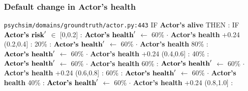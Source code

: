 \documentclass{article}%
\begin{document}
\subsubsection{Default change in Actor's health}%
\label{ssubsec:Default change in Actor's health}%
\begin{flushleft}%
\verb|psychsim/domains/groundtruth/actor.py:443|%
\linebreak%
IF %
\textbf{Actor's alive}%
\linebreak%
\hspace*{2em}%
THEN %
: %
IF %
$\mbox{\textbf{Actor's risk}} '$%
$\in$%
\linebreak%
\hspace*{4em}%
{[}0,0.2{]}%
: %
$\mbox{\textbf{Actor's health}} '$%
$\leftarrow$%
60\%%
$\cdot$%
\textbf{Actor's health}%
+0.24%
\linebreak%
\hspace*{4em}%
(0.2,0.4{]}%
: %
\linebreak%
\hspace*{6em}%
20\%%
: %
$\mbox{\textbf{Actor's health}} '$%
$\leftarrow$%
60\%%
$\cdot$%
\textbf{Actor's health}%
\linebreak%
\hspace*{6em}%
80\%%
: %
$\mbox{\textbf{Actor's health}} '$%
$\leftarrow$%
60\%%
$\cdot$%
\textbf{Actor's health}%
+0.24%
\linebreak%
\hspace*{4em}%
(0.4,0.6{]}%
: %
\linebreak%
\hspace*{6em}%
40\%%
: %
$\mbox{\textbf{Actor's health}} '$%
$\leftarrow$%
60\%%
$\cdot$%
\textbf{Actor's health}%
\linebreak%
\hspace*{6em}%
60\%%
: %
$\mbox{\textbf{Actor's health}} '$%
$\leftarrow$%
60\%%
$\cdot$%
\textbf{Actor's health}%
+0.24%
\linebreak%
\hspace*{4em}%
(0.6,0.8{]}%
: %
\linebreak%
\hspace*{6em}%
60\%%
: %
$\mbox{\textbf{Actor's health}} '$%
$\leftarrow$%
60\%%
$\cdot$%
\textbf{Actor's health}%
\linebreak%
\hspace*{6em}%
40\%%
: %
$\mbox{\textbf{Actor's health}} '$%
$\leftarrow$%
60\%%
$\cdot$%
\textbf{Actor's health}%
+0.24%
\linebreak%
\hspace*{4em}%
(0.8,1.0{]}%
: %
\linebreak%

\end{flushleft}
\end{document}
